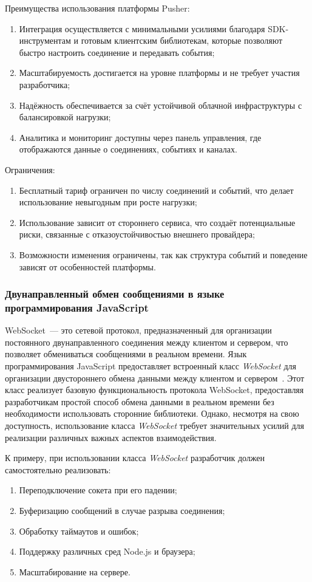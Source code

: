 Преимущества использования платформы Pusher:
\begin{enumerate}
  \item Интеграция осуществляется с минимальными усилиями благодаря SDK-инструментам и готовым клиентским библиотекам, которые позволяют быстро настроить соединение и передавать события;
  \item Масштабируемость достигается на уровне платформы и не требует участия разработчика;
  \item Надёжность обеспечивается за счёт устойчивой облачной инфраструктуры с балансировкой нагрузки;
  \item Аналитика и мониторинг доступны через панель управления, где отображаются данные о соединениях, событиях и каналах.
\end{enumerate}

Ограничения:
\begin{enumerate}
  \item Бесплатный тариф ограничен по числу соединений и событий, что делает использование невыгодным при росте нагрузки;
  \item Использование зависит от стороннего сервиса, что создаёт потенциальные риски, связанные с отказоустойчивостью внешнего провайдера;
  \item Возможности изменения ограничены, так как структура событий и поведение зависят от особенностей платформы.
\end{enumerate}

\subsubsection*{Двунаправленный обмен сообщениями в языке программирования JavaScript}

WebSocket~--- это сетевой протокол, предназначенный для организации постоянного двунаправленного соединения между клиентом и сервером, что позволяет обмениваться сообщениями в реальном времени. Язык программирования JavaScript предоставляет встроенный класс \textit{WebSocket} для организации двустороннего обмена данными между клиентом и сервером~\cite{mdn_websocket_api}. Этот класс реализует базовую функциональность протокола WebSocket, предоставляя разработчикам простой способ обмена данными в реальном времени без необходимости использовать сторонние библиотеки. Однако, несмотря на свою доступность, использование класса \textit{WebSocket} требует значительных усилий для реализации различных важных аспектов взаимодействия.

К примеру, при использовании класса \textit{WebSocket} разработчик должен самостоятельно реализовать:
\begin{enumerate}
  \item Переподключение сокета при его падении;
  \item Буферизацию сообщений в случае разрыва соединения;
  \item Обработку таймаутов и ошибок;
  \item Поддержку различных сред Node.js и браузера;
  \item Масштабирование на сервере.
\end{enumerate}

